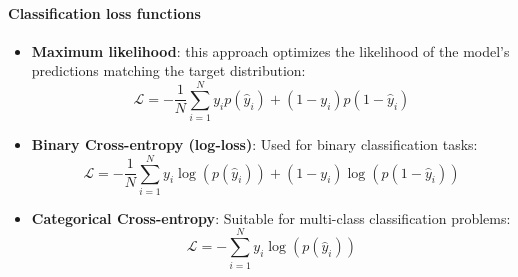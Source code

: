 \paragraph{Classification loss functions}
\begin{itemize}
    \item \textbf{Maximum likelihood}: this approach optimizes the likelihood of
          the model's predictions matching the target distribution:
          \begin{equation}
              \mathcal{L} = - \frac{1}{N} \sum_{i=1}^N y_i p(\hat{y}_i) +
              (1-y_i) p(1-\hat{y}_i)
          \end{equation}
    \item \textbf{Binary Cross-entropy (log-loss)}: Used for binary classification tasks:
          \begin{equation}
              \mathcal{L} = - \frac{1}{N} \sum_{i=1}^N y_i \log(p(\hat{y}_i))
              + (1-y_i) \log(p(1-\hat{y}_i))
          \end{equation}
    \item \textbf{Categorical Cross-entropy}: Suitable for multi-class classification problems:
          \begin{equation}
              \mathcal{L} = - \sum_{i=1}^N y_i \log(p(\hat{y}_{i}))
          \end{equation}
\end{itemize}
